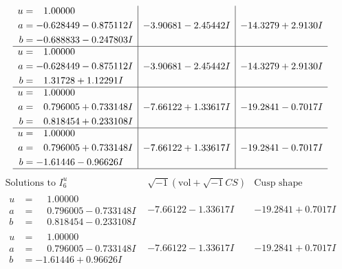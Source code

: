 \documentclass[1p]{elsarticle_modified}
\theoremstyle{definition}
\newcommand{\I}{\sqrt{-1}}
\begin{document}
$$\begin{array}{c|c|c}
\begin{aligned}
u &= \phantom{-}1.00000\phantom{ +0.000000I} \\
a &= -0.628449 - 0.875112 I \\
b &= -0.688833 - 0.247803 I\end{aligned}
 & -3.90681 - 2.45442 I & -14.3279 + 2.9130 I \\ \hline\begin{aligned}
u &= \phantom{-}1.00000\phantom{ +0.000000I} \\
a &= -0.628449 - 0.875112 I \\
b &= \phantom{-}1.31728 + 1.12291 I\end{aligned}
 & -3.90681 - 2.45442 I & -14.3279 + 2.9130 I \\ \hline\begin{aligned}
u &= \phantom{-}1.00000\phantom{ +0.000000I} \\
a &= \phantom{-}0.796005 + 0.733148 I \\
b &= \phantom{-}0.818454 + 0.233108 I\end{aligned}
 & -7.66122 + 1.33617 I & -19.2841 - 0.7017 I \\ \hline\begin{aligned}
u &= \phantom{-}1.00000\phantom{ +0.000000I} \\
a &= \phantom{-}0.796005 + 0.733148 I \\
b &= -1.61446 - 0.96626 I\end{aligned}
 & -7.66122 + 1.33617 I & -19.2841 - 0.7017 I\\
 \hline 
 \end{array}$$\newpage$$\begin{array}{c|c|c}  
\text{Solutions to }I^u_{6}& \I (\text{vol} + \sqrt{-1}CS) & \text{Cusp shape}\\
 \hline 
\begin{aligned}
u &= \phantom{-}1.00000\phantom{ +0.000000I} \\
a &= \phantom{-}0.796005 - 0.733148 I \\
b &= \phantom{-}0.818454 - 0.233108 I\end{aligned}
 & -7.66122 - 1.33617 I & -19.2841 + 0.7017 I \\ \hline\begin{aligned}
u &= \phantom{-}1.00000\phantom{ +0.000000I} \\
a &= \phantom{-}0.796005 - 0.733148 I \\
b &= -1.61446 + 0.96626 I\end{aligned}
 & -7.66122 - 1.33617 I & -19.2841 + 0.7017 I \\ \hline\begin{aligned}

\end{aligned}
\end{array}$$
\end{document}
